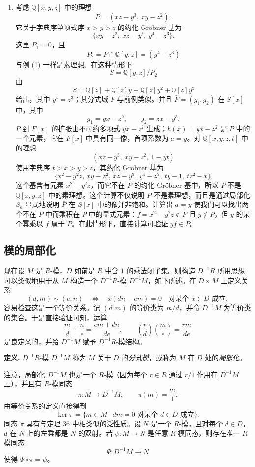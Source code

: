 \begin{enumerate}[label=(\arabic*)]
	\item 考虑 $\mathbb Q[x,y,z]$ 中的理想
	\[
	P=(xz-y^3,\ xy-z^2),
	\]
	它关于字典序单项式序 $x>y>z$ 的约化 Gröbner 基为
	\[
	\{xy-z^2,\ xz-y^3,\ y^4-z^3\}.
	\]
	这里 $P_1=0$，且
	\[
	P_2=P\cap\mathbb Q[y,z]=(y^4-z^3)
	\]
	与例 (1) 一样是素理想。在这种情形下
	\[
	S=\mathbb Q[y,z]/P_2
	\]
	由
	\[
	S=\mathbb Q[z]+\mathbb Q[z]y+\mathbb Q[z]y^2+\mathbb Q[z]y^3
	\]
	给出，其中 $y^4=z^3$；其分式域 $F$ 与前例类似。并且 $\bar P=(g_1,g_2)$ 在 $S[x]$ 中，其中
	\[
	g_1=yx-z^2,
	\qquad
	g_2=zx-y^3.
	\]
	$\bar P$ 到 $F[x]$ 的扩张由不可约多项式 $yx-z^2$ 生成；$h(x)=yx-z^2$ 是 $\bar P$ 中的一个元素，它在 $F[x]$ 中具有同一像，首项系数为 $a=y$。对 $\mathbb Q[x,y,z,t]$ 中的理想
	\[
	(xz-y^3,\ xy-z^2,\ 1-yt)
	\]
	使用字典序 $t>x>y>z$，其约化 Gröbner 基为
	\[
	\{x^2-y^2z,\ xy-z^2,\ xz-y^3,\ y^4-z^3,\ ty-1,\ tz^2-x\}.
	\]
	这个基含有元素 $x^2-y^2z$，而它不在 $P$ 的约化 Gröbner 基中，所以 $P$ 不是 $\mathbb Q[x,y,z]$ 中的素理想。这个计算不仅说明 $P$ 不是素理想，而且是通过局部化 $S_a$ 显式地说明 $\bar P$ 在 $S[x]$ 中的像并非饱和。计算出 $a=y$ 使我们可以找出两个不在 $P$ 中而乘积在 $P$ 中的显式元素：$f=x^2-y^2z\notin P$ 且 $y\notin P$，但 $y$ 的某个幂乘以 $f$ 属于 $P$。在此情形下，直接计算可验证 $yf\in P$。
\end{enumerate}

\subsection*{模的局部化}

现在设 $M$ 是 $R$-模，$D$ 如前是 $R$ 中含 $1$ 的乘法闭子集。则构造 $D^{-1}R$ 所用思想可以类似地用于从 $M$ 构造一个 $D^{-1}R$-模 $D^{-1}M$，如下所述。在 $D\times M$ 上定义关系
\[
(d,m)\sim(e,n)
\quad\Longleftrightarrow\quad
x(dn-em)=0\quad\text{对某个 }x\in D\text{ 成立},
\]
容易检查这是一个等价关系。记 $(d,m)$ 的等价类为 $m/d$，并令 $D^{-1}M$ 为等价类的集合。于是直接验证可知，运算
\[
\frac{m}{d}+\frac{n}{e}=\frac{em+dn}{de},
\qquad
\left(\frac{r}{d}\right)\left(\frac{m}{e}\right)=\frac{rm}{de}
\]
是良定义的，并给 $D^{-1}M$ 赋予 $D^{-1}R$-模结构。

\noindent\textbf{定义.} $D^{-1}R$-模 $D^{-1}M$ 称为 $M$ 关于 $D$ 的\emph{分式模}，或称为 $M$ 在 $D$ 处的\emph{局部化}。

注意，局部化 $D^{-1}M$ 也是一个 $R$-模（因为每个 $r\in R$ 通过 $r/1$ 作用在 $D^{-1}M$ 上），并且有 $R$-模同态
\[
\pi:M\longrightarrow D^{-1}M,
\qquad
\pi(m)=\frac{m}{1}.
\]
由等价关系的定义直接得到
\[
\ker\pi=\{m\in M\mid dm=0\text{ 对某个 }d\in D\text{ 成立}\}.
\]
同态 $\pi$ 具有与定理 36 中相类似的泛性质。设 $N$ 是一个 $R$-模，且对每个 $d\in D$，$d$ 在 $N$ 上的左乘都是 $N$ 的双射。若 $\psi:M\to N$ 是任意 $R$-模同态，则存在唯一 $R$-模同态
\[
\Psi:D^{-1}M\longrightarrow N
\]
使得 $\Psi\circ\pi=\psi$。

